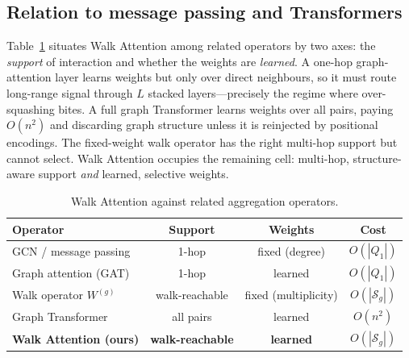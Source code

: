\subsection{Relation to message passing and Transformers}

Table~\ref{tab:relation} situates Walk Attention among related operators by two
axes: the \emph{support} of interaction and whether the weights are
\emph{learned}. A one-hop graph-attention layer \cite{velickovic2017graph} learns
weights but only over direct neighbours, so it must route long-range signal
through $L$ stacked layers---precisely the regime where over-squashing bites. A
full graph Transformer \cite{vaswani2017attention} learns weights over all pairs,
paying $O(n^2)$ and discarding graph structure unless it is reinjected by
positional encodings. The fixed-weight walk operator has the right multi-hop
support but cannot select. Walk Attention occupies the remaining cell: multi-hop,
structure-aware support \emph{and} learned, selective weights.

\begin{table}[t]
\centering
\caption{Walk Attention against related aggregation operators.}
\label{tab:relation}
\begin{tabular}{lccc}
\toprule
\textbf{Operator} & \textbf{Support} & \textbf{Weights} & \textbf{Cost} \\
\midrule
GCN / message passing       & 1-hop      & fixed (degree) & $O(|Q_1|)$ \\
Graph attention (GAT)       & 1-hop      & learned        & $O(|Q_1|)$ \\
Walk operator $W^{(g)}$     & walk-reachable & fixed (multiplicity) & $O(|\mathcal{S}_g|)$ \\
Graph Transformer           & all pairs  & learned        & $O(n^2)$ \\
\textbf{Walk Attention (ours)} & \textbf{walk-reachable} & \textbf{learned} & $O(|\mathcal{S}_g|)$ \\
\bottomrule
\end{tabular}
\end{table}
